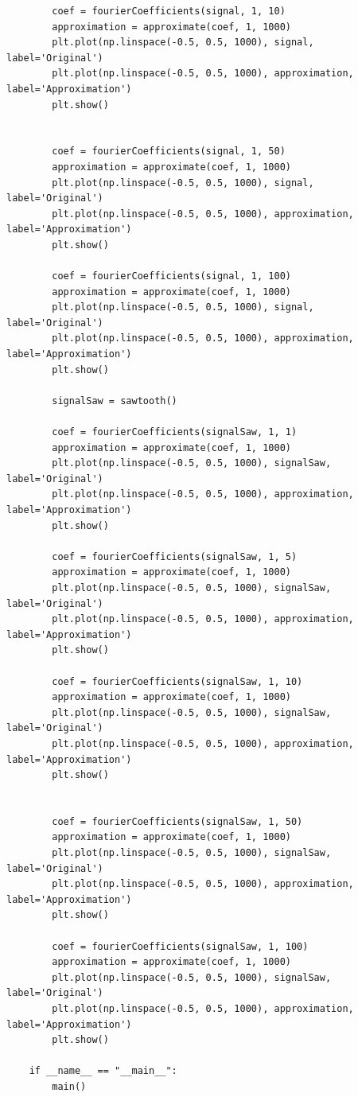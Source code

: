 \documentclass[10pt,a4paper, margin=1in]{article}
\begin{document}
\begin{enumerate}
\begin{lstlisting}
        coef = fourierCoefficients(signal, 1, 10)
        approximation = approximate(coef, 1, 1000)
        plt.plot(np.linspace(-0.5, 0.5, 1000), signal, label='Original')
        plt.plot(np.linspace(-0.5, 0.5, 1000), approximation, label='Approximation')
        plt.show()


        coef = fourierCoefficients(signal, 1, 50)
        approximation = approximate(coef, 1, 1000)
        plt.plot(np.linspace(-0.5, 0.5, 1000), signal, label='Original')
        plt.plot(np.linspace(-0.5, 0.5, 1000), approximation, label='Approximation')
        plt.show()

        coef = fourierCoefficients(signal, 1, 100)
        approximation = approximate(coef, 1, 1000)
        plt.plot(np.linspace(-0.5, 0.5, 1000), signal, label='Original')
        plt.plot(np.linspace(-0.5, 0.5, 1000), approximation, label='Approximation')
        plt.show()

        signalSaw = sawtooth()

        coef = fourierCoefficients(signalSaw, 1, 1)
        approximation = approximate(coef, 1, 1000)
        plt.plot(np.linspace(-0.5, 0.5, 1000), signalSaw, label='Original')
        plt.plot(np.linspace(-0.5, 0.5, 1000), approximation, label='Approximation')
        plt.show()

        coef = fourierCoefficients(signalSaw, 1, 5)
        approximation = approximate(coef, 1, 1000)
        plt.plot(np.linspace(-0.5, 0.5, 1000), signalSaw, label='Original')
        plt.plot(np.linspace(-0.5, 0.5, 1000), approximation, label='Approximation')
        plt.show()

        coef = fourierCoefficients(signalSaw, 1, 10)
        approximation = approximate(coef, 1, 1000)
        plt.plot(np.linspace(-0.5, 0.5, 1000), signalSaw, label='Original')
        plt.plot(np.linspace(-0.5, 0.5, 1000), approximation, label='Approximation')
        plt.show()


        coef = fourierCoefficients(signalSaw, 1, 50)
        approximation = approximate(coef, 1, 1000)
        plt.plot(np.linspace(-0.5, 0.5, 1000), signalSaw, label='Original')
        plt.plot(np.linspace(-0.5, 0.5, 1000), approximation, label='Approximation')
        plt.show()

        coef = fourierCoefficients(signalSaw, 1, 100)
        approximation = approximate(coef, 1, 1000)
        plt.plot(np.linspace(-0.5, 0.5, 1000), signalSaw, label='Original')
        plt.plot(np.linspace(-0.5, 0.5, 1000), approximation, label='Approximation')
        plt.show()

    if __name__ == "__main__":
        main()
                        
    \end{lstlisting}
\end{enumerate}
\end{document}
